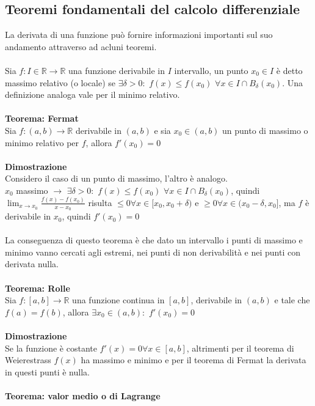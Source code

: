 \documentclass{article}
\begin{document}
\subsection{Teoremi fondamentali del calcolo differenziale}
La derivata di una funzione può fornire informazioni importanti sul suo andamento attraverso ad acluni teoremi.\\\\
Sia $f:I\in\mathds{R}\rightarrow\mathds{R}$ una funzione derivabile in $I$ intervallo, un punto $x_0\in I$ è detto massimo relativo (o locale) se $\exists\delta>0:$ $f(x)\leq f(x_0)$ $\forall x\in I\cap B_\delta(x_0)$. Una definizione analoga vale per il minimo relativo.\\\\
\textbf{Teorema: Fermat}\\
Sia $f:(a,b)\rightarrow\mathds{R}$ derivabile in $(a,b)$ e sia $x_0\in(a,b)$ un punto di massimo o minimo relativo per $f$, allora $f'(x_0)=0$\\\\
\textbf{Dimostrazione}\\
Considero il caso di un punto di massimo, l'altro è analogo.\\
$x_0$ massimo $\rightarrow$ $\exists\delta>0:$ $f(x)\leq f(x_0)$ $\forall x\in I\cap B_\delta(x_0)$, quindi $\lim_{x\rightarrow x_0}\frac{f(x)-f(x_0)}{x-x_0}$ risulta $\leq0\forall x\in[x_0,x_0+\delta)$ e $\geq0\forall x\in(x_0-\delta,x_0]$, ma $f$ è derivabile in $x_0$, quindi $f'(x_0)=0$\\\\
La conseguenza di questo teorema è che dato un intervallo i punti di massimo e minimo vanno cercati agli estremi, nei punti di non derivabilità e nei punti con derivata nulla.\\\\
\textbf{Teorema: Rolle}\\
Sia $f:[a,b]\rightarrow\mathds{R}$ una funzione continua in $[a,b]$, derivabile in $(a,b)$ e tale che $f(a)=f(b)$, allora $\exists  x_0\in(a,b):$ $f'(x_0)=0$\\\\
\textbf{Dimostrazione}\\
Se la funzione è costante $f'(x)=0\forall x\in [a,b]$, altrimenti per il teorema di Weierestrass $f(x)$ ha massimo e minimo e per il teorema di Fermat la derivata in questi punti è nulla.\\\\
\textbf{Teorema: valor medio o di Lagrange}\\
\end{document}
